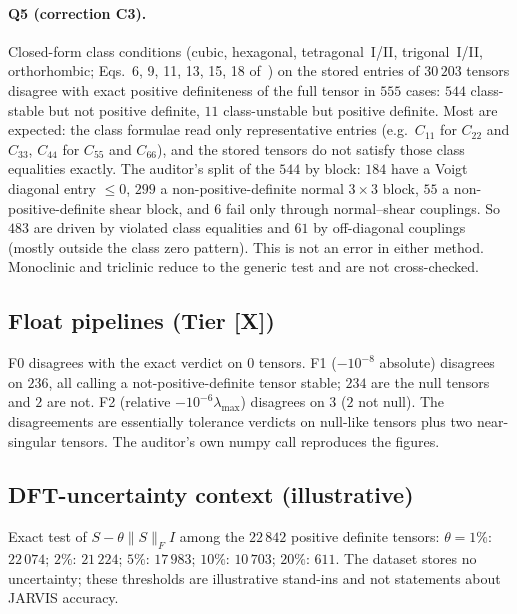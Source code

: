 \documentclass[10pt]{article}
\newcommand{\tier}[1]{\textsf{[#1]}}
\newcommand{\tX}{\tier{X}}
\begin{document}
\paragraph{Q5 (correction C3).} Closed-form class conditions (cubic, hexagonal, tetragonal~I/II, trigonal~I/II, orthorhombic; Eqs.~6, 9, 11, 13, 15, 18 of~\cite{mc}) on the stored entries of $30\,203$ tensors disagree with exact positive definiteness of the full tensor in $555$ cases: $544$ class-stable but not positive definite, $11$ class-unstable but positive definite. Most are expected: the class formulae read only representative entries (e.g.\ $C_{11}$ for $C_{22}$ and $C_{33}$, $C_{44}$ for $C_{55}$ and $C_{66}$), and the stored tensors do not satisfy those class equalities exactly. The auditor's split of the $544$ by block: $184$ have a Voigt diagonal entry $\le0$, $299$ a non-positive-definite normal $3\times3$ block, $55$ a non-positive-definite shear block, and $6$ fail only through normal--shear couplings. So $483$ are driven by violated class equalities and $61$ by off-diagonal couplings (mostly outside the class zero pattern). This is not an error in either method. Monoclinic and triclinic reduce to the generic test and are not cross-checked.

\subsection{Float pipelines (Tier \tX)}
F0 disagrees with the exact verdict on $0$ tensors. F1 ($-10^{-8}$ absolute) disagrees on $236$, all calling a not-positive-definite tensor stable; $234$ are the null tensors and $2$ are not. F2 (relative $-10^{-6}\lambda_{\max}$) disagrees on $3$ ($2$ not null). The disagreements are essentially tolerance verdicts on null-like tensors plus two near-singular tensors. The auditor's own numpy call reproduces the figures.

\subsection{DFT-uncertainty context (illustrative)}
Exact test of $S-\theta\|S\|_F I$ among the $22\,842$ positive definite tensors: $\theta=1\%$: $22\,074$; $2\%$: $21\,224$; $5\%$: $17\,983$; $10\%$: $10\,703$; $20\%$: $611$. The dataset stores no uncertainty; these thresholds are illustrative stand-ins and not statements about JARVIS accuracy.
\end{document}
